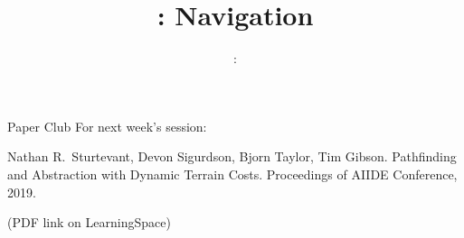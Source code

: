 \usepackage{../../beamerthemeFalmouthGamesAcademy}
\usepackage{multimedia}
\graphicspath{ {../../} }


\usepackage[normalem]{ulem}
\usepackage{wasysym}

\usepackage{pdfpages}

\usetikzlibrary{arrows,automata}



\hypersetup{
pdftex,
pdftitle=\sessionnumber: Navigation,
pdfauthor=Ed Powley,
pdfdisplaydoctitle,
pdflang=en-GB
}


\title{\sessionnumber: Navigation}
\subtitle{\modulecode: \moduletitle}

\frame{\titlepage} 

\begin{frame}{Paper Club}
	For next week's session:
	
	Nathan R.\ Sturtevant, Devon Sigurdson, Bjorn Taylor, Tim Gibson.
	Pathfinding and Abstraction with Dynamic Terrain Costs.
	Proceedings of AIIDE Conference, 2019.
	
	(PDF link on LearningSpace)
\end{frame}





